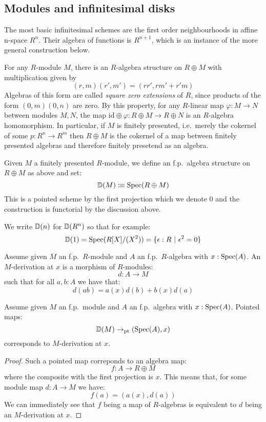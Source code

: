 
\subsection{Modules and infinitesimal disks}
The most basic infinitesimal schemes are the first order neighbourhoods in affine n-space $R^n$. Their algebra of functions is $R^{n+1}$, which is an instance of the more general construction below.

For any $R$-module $M$, there is an $R$-algebra structure on $R\oplus M$ with multiplication given by
\[(r,m)(r',m') = (rr',rm'+r'm)\]
Algebras of this form are called \emph{square zero extensions} of $R$, since products of the form $(0,m)(0,n)$ are zero.
By this property, for any $R$-linear map $\varphi:M\to N$ between modules $M,N$, the map $\mathrm{id}\oplus \varphi: R\oplus M\to R\oplus N$ is an $R$-algebra homomorphism. In particular, if $M$ is finitely presented, i.e.\ merely the cokernel of some $p:R^n\to R^m$ then $R\oplus M$ is the cokernel of a map between finitely presented algebras and therefore finitely presetend as an algebra. 

\begin{definition}
Given $M$ a finitely presented $R$-module, we define an f.p.\ algebra structure on $R\oplus M$ as above and set:
\[\mathbb{D}(M)\vcentcolon\mspace{-1.2mu}\equiv \operatorname{Spec}(R\oplus M)\]
This is a pointed scheme by the first projection which we denote $0$
and the construction is functorial by the discussion above.
\end{definition}

We write $\mathbb{D}(n)$ for $\mathbb{D}(R^n)$ so that for example:
\[\D(1) = \Spec(R[X]/(X^2)) = \{\epsilon:R\ |\ \epsilon^2=0\}\]

\begin{definition}
Assume given $M$ an f.p.\ $R$-module and $A$ an f.p.\ $R$-algebra with $x:\operatorname{Spec}(A)$. An $M$-derivation at $x$ is a morphism of $R$-modules:
\[d:A\to M\]
such that for all $a,b:A$ we have that:
\[d(ab) = a(x)d(b) + b(x)d(a)\]
\end{definition}

\begin{lemma}\label{tangent-are-derivation}
Assume given $M$ an f.p.\ module and $A$ an f.p.\ algebra with $x:\operatorname{Spec}(A)$. Pointed maps:
\[\mathbb{D}(M)\to_{\mathrm{pt}} (\operatorname{Spec}(A),x)\] 
corresponds to $M$-derivation at $x$.
\end{lemma}

\begin{proof}
Such a pointed map correponds to an algebra map:
\[f : A\to R\oplus M\]
where the composite with the first projection is $x$. This means that, for some module map $d:A\to M$ we have:
\[f(a) = (a(x),d(a))\]
We can immediately see that $f$ being a map of $R$-algebras is equivalent to $d$ being an $M$-derivation at $x$.
\end{proof}

